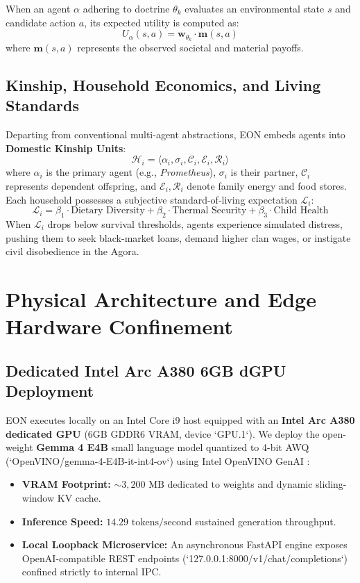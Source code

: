 \documentclass[11pt,a4paper]{article}
\begin{document}
When an agent $\alpha$ adhering to doctrine $\theta_k$ evaluates an environmental state $s$ and candidate action $a$, its expected utility is computed as:
\begin{equation}
U_{\alpha}(s, a) = \mathbf{w}_{\theta_k} \cdot \mathbf{m}(s, a)
\end{equation}
where $\mathbf{m}(s, a)$ represents the observed societal and material payoffs.

\subsection{Kinship, Household Economics, and Living Standards}
Departing from conventional multi-agent abstractions, EON embeds agents into \textbf{Domestic Kinship Units}:
\begin{equation}
\mathcal{H}_i = \langle \alpha_i, \sigma_i, \mathcal{C}_i, \mathcal{E}_i, \mathcal{R}_i \rangle
\end{equation}
where $\alpha_i$ is the primary agent (e.g., \textit{Prometheus}), $\sigma_i$ is their partner, $\mathcal{C}_i$ represents dependent offspring, and $\mathcal{E}_i, \mathcal{R}_i$ denote family energy and food stores. Each household possesses a subjective standard-of-living expectation $\mathcal{L}_i$:
\begin{equation}
\mathcal{L}_i = \beta_1 \cdot \text{Dietary Diversity} + \beta_2 \cdot \text{Thermal Security} + \beta_3 \cdot \text{Child Health}
\end{equation}
When $\mathcal{L}_i$ drops below survival thresholds, agents experience simulated distress, pushing them to seek black-market loans, demand higher clan wages, or instigate civil disobedience in the Agora.

\section{Physical Architecture and Edge Hardware Confinement}
\label{sec:hardware_architecture}

\subsection{Dedicated Intel Arc A380 6GB dGPU Deployment}
EON executes locally on an Intel Core i9 host equipped with an \textbf{Intel Arc A380 dedicated GPU} (6GB GDDR6 VRAM, device `GPU.1`). We deploy the open-weight \textbf{Gemma 4 E4B} small language model quantized to 4-bit AWQ (`OpenVINO/gemma-4-E4B-it-int4-ov`) using Intel OpenVINO GenAI \cite{intel2024openvino}:
\begin{itemize}[leftmargin=*]
    \item \textbf{VRAM Footprint:} $\sim 3,200\text{ MB}$ dedicated to weights and dynamic sliding-window KV cache.
    \item \textbf{Inference Speed:} $14.29\text{ tokens/second}$ sustained generation throughput.
    \item \textbf{Local Loopback Microservice:} An asynchronous FastAPI engine exposes OpenAI-compatible REST endpoints (`127.0.0.1:8000/v1/chat/completions`) confined strictly to internal IPC.
\end{itemize}
\end{document}
